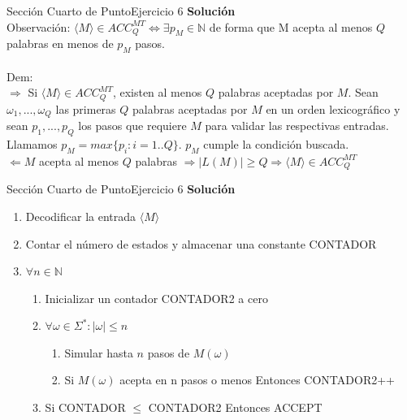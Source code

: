 \documentclass[10pt, envcountsect, presentation, aspectratio=169]{beamer}
\begin{document}
\begin{frame}{Sección Cuarto de Punto}{Ejercicio 6}
    \textbf{Solución}\\
    Observación: $\langle M \rangle \in ACC_{Q}^{MT} \Leftrightarrow \exists p_M \in \mathbb{N}$ de forma que M acepta al menos $Q$ palabras en menos de $p_M$ pasos.\\~\\
    Dem:\\
    $\Rightarrow$ Si $\langle M \rangle \in ACC_{Q}^{MT}$, existen al menos $Q$ palabras aceptadas por $M$.
    Sean $\omega_1, ..., \omega_Q$ las primeras $Q$ palabras aceptadas por $M$ en un orden lexicográfico y sean $p_1,...,p_Q$ los pasos que requiere $M$ para validar las respectivas entradas.
    Llamamos $p_M = max\{p_i:i=1..Q\}$. $p_M$ cumple la condición buscada.\\
    $\Leftarrow M$ acepta al menos $Q$ palabras  $\Rightarrow |L(M)| \geq Q \Rightarrow \langle M \rangle \in ACC_{Q}^{MT}$  
\end{frame}
    


\begin{frame}{Sección Cuarto de Punto}{Ejercicio 6}
    \textbf{Solución}\\
    \begin{enumerate}
        \item Decodificar la entrada $\langle M \rangle$
        \item Contar el número de estados y almacenar una constante CONTADOR
        \item $\forall n \in \mathbb{N}$
        \begin{enumerate}
            \item Inicializar un contador CONTADOR2 a cero 
            \item $\forall \omega \in \Sigma^* : |\omega| \leq n$
            \begin{enumerate}
                \item Simular hasta $n$ pasos de $M(\omega)$
                \item Si $M(\omega)$ acepta en n pasos o menos Entonces CONTADOR2++
            \end{enumerate}
            \item Si CONTADOR $\leq$ CONTADOR2 Entonces ACCEPT
        \end{enumerate}
    \end{enumerate}
\end{frame}
\end{document}
